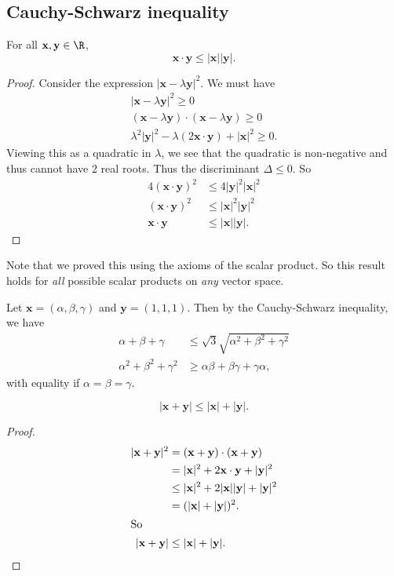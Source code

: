 \documentclass[a4paper]{article}
\begin{document}
\subsection{Cauchy-Schwarz inequality}
\begin{thm}
  For all $\mathbf{x, y}\in \R$,
  \[
    \mathbf{x\cdot y \leq |x||y|}.
  \]
\end{thm}

\begin{proof}
  Consider the expression $|\mathbf{x} - \lambda \mathbf{y}|^2$. We must have
  \begin{align*}
    |\mathbf{x} - \lambda\mathbf{y}|^2 \geq 0\\
    (\mathbf{x} - \lambda\mathbf{y})\cdot (\mathbf{x} - \lambda\mathbf{y}) \geq 0\\
    \lambda^2 |\mathbf{y}|^2 - \lambda (2\mathbf{x\cdot y}) + |\mathbf{x}|^2 \geq 0.
  \end{align*}
  Viewing this as a quadratic in $\lambda$, we see that the quadratic is non-negative and thus cannot have 2 real roots. Thus the discriminant $\Delta \leq 0$. So
  \begin{align*}
    4(\mathbf{x\cdot y})^2 &\leq 4|\mathbf{y}|^2|\mathbf{x}|^2\\
    (\mathbf{x\cdot y})^2 &\leq |\mathbf{x}|^2|\mathbf{y}|^2\\
    \mathbf{x\cdot y} &\leq \mathbf{|x||y|}.
  \end{align*}
\end{proof}
Note that we proved this using the axioms of the scalar product. So this result holds for \emph{all} possible scalar products on \emph{any} vector space.

\begin{eg}
  Let $\mathbf{x} = (\alpha, \beta, \gamma)$ and $\mathbf{y} = (1, 1, 1)$. Then by the Cauchy-Schwarz inequality, we have
  \begin{align*}
    \alpha + \beta + \gamma &\leq \sqrt{3}\sqrt{\alpha^2 + \beta^2 + \gamma^2}\\
    \alpha^2 + \beta^2 + \gamma^2 &\geq \alpha\beta + \beta\gamma + \gamma\alpha,
  \end{align*}
  with equality if $\alpha = \beta = \gamma$.
\end{eg}

\begin{cor}
  \[
    \mathbf{|x + y|} \leq \mathbf{|x| + |y|}.
  \]
\end{cor}
\begin{proof}
  \begin{align*}
    |\mathbf{x + y}|^2 &= \mathbf{(x + y)\cdot (x + y)}\\
    &= |\mathbf{x}|^2 + 2\mathbf{x\cdot y} + |\mathbf{y}|^2\\
    &\leq |\mathbf{x}|^2 + 2\mathbf{|x||y|} + |\mathbf{y}|^2\\
    &= (\mathbf{|x| + |y|})^2.\\
    \intertext{So}
    \mathbf{|x + y|} &\leq \mathbf{|x| + |y|}.
  \end{align*}
\end{proof}
\end{document}
